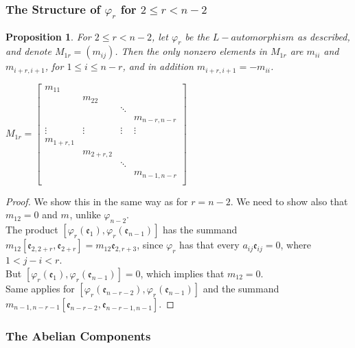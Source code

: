 \documentclass{article}
\newtheorem{proposition4}[paragraph]{Proposition}
\newcommand{\e}{\mathfrak{e}}
\begin{document}
\subsubsection{The Structure of $\varphi_r$ for $2\leq{r}<n-2$}
\begin{proposition4}
For $2\leq{r}<n-2$, let $\varphi_r$ be the ${L}-automorphism$ as described, and denote $M_{1r}=(m_{ij})$. Then the only nonzero elements in $M_{1r}$ are $m_{ii}$ and $m_{i+r,i+1}$, for $1\leq{i}\leq{n-r}$, and in addition $m_{i+r,i+1}=-m_{ii}$.
\end{proposition4}
$M_{1r}=\begin{bmatrix}
m_{11}&&&\\
&m_{22}&&\\
&&\ddots&\\
&&&m_{n-r,n-r}\\
\vdots&\vdots&\vdots&\vdots\\
m_{1+r,1}&&&\\
&m_{2+r,2}&&\\
&&\ddots&\\
&&&m_{n-1,n-r}\\
\end{bmatrix}$
\begin{proof}
We show this in the same way as for $r=n-2$. We need to show also that $m_{12}=0$ and $m_{}$, unlike $\varphi_{n-2}$.\\
The product $[\varphi_r(\e_1),\varphi_r(\e_{n-1})]$ has the summand $m_{12}[\e_{2,2+r},\e_{2+r}]=m_{12}\e_{2,r+3}$, since $\varphi_r$ has that every $a_{ij}\e_{ij}=0$, where $1<j-i<r$.\\
But $[\varphi_r(\e_1),\varphi_r(\e_{n-1})]=0$, which implies that $m_{12}=0$.\\
Same applies for $[\varphi_r(\e_{n-r-2}),\varphi_r(\e_{n-1})]$ and the summand $m_{n-1,n-r-1}[\e_{n-r-2},\e_{n-r-1,n-1}]$.
\end{proof}

\subsubsection{The Abelian Components}
\end{document}
